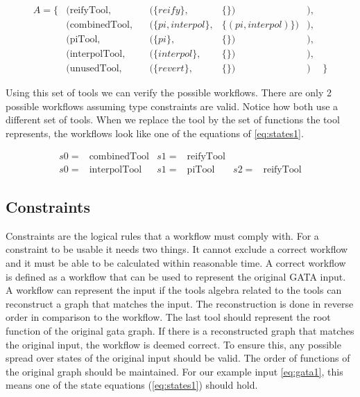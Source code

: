 \documentclass{article}
\begin{document}
\begin{align}
    A =  \{ & (\text{reifyTool},& & (\{reify \} ,& \{\})&), \nonumber\\ 
    & (\text{combinedTool},& & (\{pi,interpol \} ,& \{(pi,interpol)\})&), \nonumber\\ 
    & (\text{piTool},& & (\{pi \} ,& \{\})&), \nonumber\\ 
    & (\text{interpolTool},& & (\{interpol \} ,& \{\})&),\nonumber\\ 
    & (\text{unusedTool},& & (\{revert \} ,& \{\})&)   \label{eq:toolannotations}
    &\}
\end{align}

Using this set of tools we can verify the possible workflows. There are only 2 possible workflows assuming type constraints are valid. Notice how both use a different set of tools. When we replace the tool by the set of functions the tool represents, the workflows look like one of the equations of \ref{eq:states1}.

\begin{align}
    s0=& \text{combinedTool} & s1=&\text{reifyTool} & &  \label{eq:solution1}\\
    s0=& \text{interpolTool} & s1=&\text{piTool} & s2=&\text{reifyTool} \label{eq:solution2} 
\end{align}

\subsection{Constraints}


Constraints are the logical rules that a workflow must comply with.
For a constraint to be usable it needs two things. It cannot exclude a correct workflow and it must be able to be calculated within reasonable time. 
A correct workflow is defined as a workflow that can be used to represent the original GATA input. A workflow can represent the input if the tools algebra related to the tools can reconstruct a graph that matches the input. The reconstruction is done in reverse order in comparison to the workflow. The last tool should represent the root function of the original gata graph. If there is a reconstructed graph that matches the original input, the workflow is deemed correct. 
To ensure this, any possible spread over states of the original input should be valid. The order of functions of the original graph should be maintained. For our example input \ref{eq:gata1}, this means one of the state equations (\ref{eq:states1}) should hold. 
\end{document}
